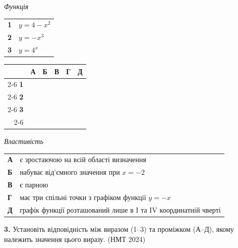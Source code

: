 \documentclass[14pt]{extarticle}
\newcommand{\answerGrid}{
    \begingroup
    \setlength{\tabcolsep}{4pt}
    \renewcommand{\arraystretch}{1.2}
    \small
    \begin{tabular}{r|c|c|c|c|c|}
         \multicolumn{1}{c}{} & \multicolumn{1}{c}{\textbf{А}} & \multicolumn{1}{c}{\textbf{Б}} & \multicolumn{1}{c}{\textbf{В}} & \multicolumn{1}{c}{\textbf{Г}} & \multicolumn{1}{c}{\textbf{Д}} \\ \cline{2-6}
         \textbf{1} & & & & & \\ \cline{2-6}
         \textbf{2} & & & & & \\ \cline{2-6}
         \textbf{3} & & & & & \\ \cline{2-6}
    \end{tabular}
    \endgroup
}
\newcommand{\nmtyear}[1]{\hfill{\small\color{yearcolor}(НМТ #1)}}
\begin{document}
\noindent
\begin{minipage}[t]{0.22\textwidth}
    \textit{Функція} \par \vspace{0.2cm}
    \begin{tabular}{@{}p{0.5cm} l@{}}
    \textbf{1} & $y = 4 - x^2$ \\[0.4cm]
    \textbf{2} & $y = -x^3$ \\[0.4cm]
    \textbf{3} & \colorbox{yellow!30}{$y = 4^x$} \\
    \end{tabular}
    
    \vspace{0.3cm}
    \answerGrid
\end{minipage}%
\hfill
\begin{minipage}[t]{0.75\textwidth}
    \textit{Властивість} \par \vspace{0.2cm}
    \begin{tabular}{@{}p{0.5cm} p{10cm}@{}}
    \textbf{А} & є зростаючою на всій області визначення \\[0.2cm]
    \textbf{Б} & набуває від'ємного значення при $x = -2$ \\[0.2cm]
    \textbf{В} & є парною \\[0.2cm]
    \textbf{Г} & має три спільні точки з графіком функції $y = -x$ \\[0.2cm]
    \textbf{Д} & графік функції розташований лише в I та IV координатній чверті \\
    \end{tabular}
\end{minipage}
\vspace{0.7cm}

\noindent\textbf{3.} Установіть відповідність між виразом (1–3) та проміжком (А–Д), якому належить значення цього виразу. \nmtyear{2024}
\vspace{0.3cm}
\end{document}

